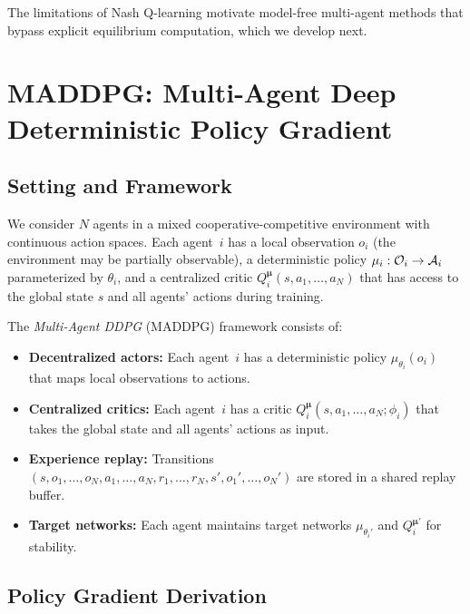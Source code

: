 \documentclass[11pt,a4paper]{article}
\begin{document}
The limitations of Nash Q-learning motivate model-free multi-agent
methods that bypass explicit equilibrium computation, which we develop
next.


\section{MADDPG: Multi-Agent Deep Deterministic Policy Gradient}
\label{sec:maddpg}

\subsection{Setting and Framework}

We consider $N$ agents in a mixed cooperative-competitive environment
with continuous action spaces.  Each agent~$i$ has a local observation
$o_i$ (the environment may be partially observable), a deterministic
policy $\mu_i : \mathcal{O}_i \to \mathcal{A}_i$ parameterized by
$\theta_i$, and a centralized critic
$Q_i^{\boldsymbol{\mu}}(s, a_1, \ldots, a_N)$ that has access to the
global state $s$ and all agents' actions during training.

\begin{definition}
\label{def:maddpg}
The \emph{Multi-Agent DDPG} (MADDPG) framework consists of:
\begin{itemize}
  \item \textbf{Decentralized actors:} Each agent~$i$ has a
    deterministic policy $\mu_{\theta_i}(o_i)$ that maps local
    observations to actions.
  \item \textbf{Centralized critics:} Each agent~$i$ has a critic
    $Q_i^{\boldsymbol{\mu}}(s, a_1, \ldots, a_N ; \phi_i)$ that takes
    the global state and all agents' actions as input.
  \item \textbf{Experience replay:} Transitions
    $(s, o_1, \ldots, o_N, a_1, \ldots, a_N, r_1, \ldots, r_N,
    s', o_1', \ldots, o_N')$ are stored in a shared replay buffer.
  \item \textbf{Target networks:} Each agent maintains target networks
    $\mu_{\theta_i'}$ and $Q_i^{\boldsymbol{\mu}'}$ for stability.
\end{itemize}
\end{definition}

\subsection{Policy Gradient Derivation}
\end{document}
